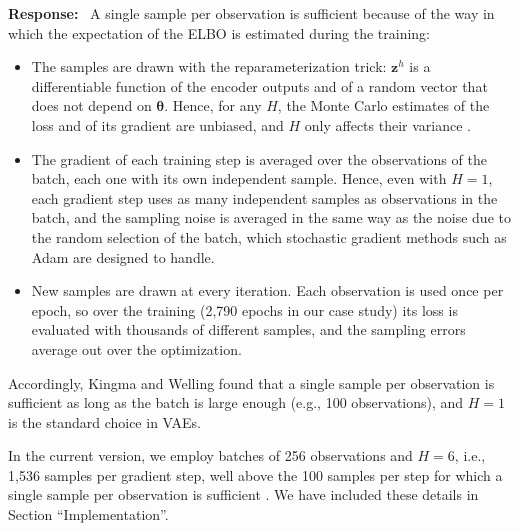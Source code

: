 \documentclass[11pt]{article}
\newenvironment{response}{\par\smallskip\noindent\color{resp}\textbf{Response:}\ }{\par}
\newcommand{\z}{\mathbf{z}}
\begin{document}
\begin{response}
A single sample per observation is sufficient because of the way in which the expectation of the ELBO is estimated during the training:
\begin{itemize}[leftmargin=*]
	\item The samples are drawn with the reparameterization trick: $\z^{h}$ is a differentiable function of the encoder outputs and of a random vector that does not depend on $\bm\theta$. Hence, for any $H$, the Monte Carlo estimates of the loss and of its gradient are unbiased, and $H$ only affects their variance \cite{kingma2014auto,mohamed2020monte}.
	\item The gradient of each training step is averaged over the observations of the batch, each one with its own independent sample. Hence, even with $H=1$, each gradient step uses as many independent samples as observations in the batch, and the sampling noise is averaged in the same way as the noise due to the random selection of the batch, which stochastic gradient methods such as Adam are designed to handle.
	\item New samples are drawn at every iteration. Each observation is used once per epoch, so over the training (2,790 epochs in our case study) its loss is evaluated with thousands of different samples, and the sampling errors average out over the optimization.
\end{itemize}
Accordingly, Kingma and Welling \cite{kingma2014auto} found that a single sample per observation is sufficient as long as the batch is large enough (e.g., 100 observations), and $H=1$ is the standard choice in VAEs.

In the current version, we employ batches of 256 observations and $H=6$, i.e., 1,536 samples per gradient step, well above the 100 samples per step for which a single sample per observation is sufficient \cite{kingma2014auto}.
We have included these details in Section ``Implementation''.

\end{response}
\end{document}
